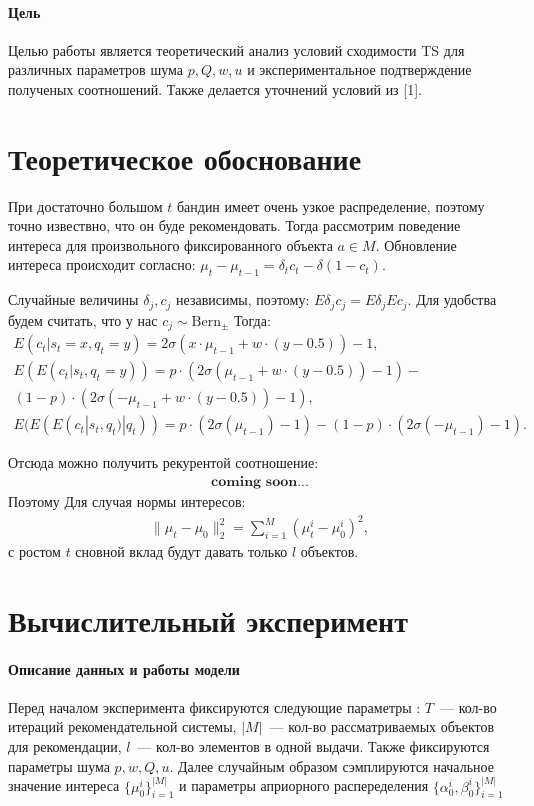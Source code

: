 \documentclass[12pt, twoside]{article}
\begin{document}
\paragraph{Цель}
Целью работы является теоретический анализ условий сходимости TS для различных параметров шума $p, Q, w, u$ и экспериментальное подтверждение полученых соотношений. 
Также делается уточнений условий из [1]. 

\section{Теоретическое обоснование}
При достаточно большом $t$ бандин имеет очень узкое распределение, поэтому точно извествно, что он буде рекомендовать.
Тогда рассмотрим поведение интереса для произвольного фиксированного объекта $a \in M$. 
Обновление интереса происходит согласно: $\mu_t - \mu_{t-1} = \delta_t c_t - \delta (1 - c_t)$.

Случайные величины $\delta_j, c_j$ независимы, поэтому: $E \delta_j c_j = E \delta_j E c_j$. 
Для удобства будем считать, что у нас $c_j \sim \text{Bern}_{\pm}$
Тогда: 
\begin{gather*}
  E (c_t | s_t = x, q_t = y) = 2 \sigma(x \cdot \mu_{t-1} + w \cdot (y-0.5)) - 1, \\
  E (E (c_t | s_t, q_t = y)) = p \cdot (2 \sigma(\mu_{t-1} + w \cdot (y-0.5)) - 1) - \\ (1-p) \cdot (2 \sigma(- \mu_{t-1} + w \cdot (y-0.5)) - 1), \\ 
  E( E (E (c_t | s_t, q_t) | q_t)) = p \cdot (2 \sigma(\mu_{t-1}) - 1) -  (1-p) \cdot (2 \sigma(-\mu_{t-1}) - 1). 
\end{gather*}

Отсюда можно получить рекурентой соотношение:
\begin{gather*}
  \textbf{coming soon...}
\end{gather*}
Поэтому 
Для случая нормы интересов: 
\begin{gather*}
  \|\mu_t - \mu_0 \|^2_2 = \sum_{i=1}^M (\mu_t^i - \mu_0^i)^2,
\end{gather*}
с ростом $t$ сновной вклад будут давать только $l$ объектов.

\section{Вычислительный эксперимент}
\paragraph{Описание данных и работы модели}
Перед началом эксперимента фиксируются следующие параметры : $T$~--- кол-во итераций рекомендательной системы, $|M|$~--- кол-во рассматриваемых объектов для рекомендации, $l$~--- кол-во элементов в одной выдачи. 
Также фиксируются параметры шума $p, w, Q, u$.
Далее случайным образом сэмплируются начальное значение интереса $\{\mu_0^i\}_{i=1}^{|M|}$ и параметры априорного распеределения $\{\alpha_0^i, \beta_0^i\}_{i=1}^{|M|}$  
\end{document}
